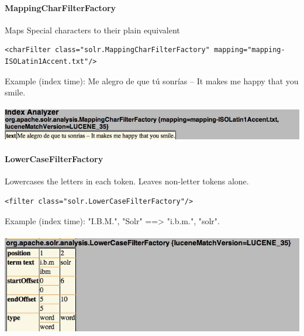 \paragraph{MappingCharFilterFactory} Maps Special characters to their plain equivalent
\begin{verbatim}
<charFilter class="solr.MappingCharFilterFactory" mapping="mapping-ISOLatin1Accent.txt"/>
\end{verbatim}
Example (index time): Me alegro de que tú sonrías – It makes me happy that you smile.
\mbox{} \\
\mbox{} \\
\includegraphics[width=\textwidth]{images/mappingcharfilterfactory.jpg}

\paragraph{LowerCaseFilterFactory} Lowercases the letters in each token. Leaves non-letter tokens alone. 
\begin{verbatim}
<filter class="solr.LowerCaseFilterFactory"/>
\end{verbatim}
Example (index time): "I.B.M.", "Solr" ==> "i.b.m.", "solr".
\mbox{} \\
\mbox{} \\
\includegraphics[width=\textwidth]{images/lowercasefilterfactory.jpg}

